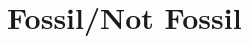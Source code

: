 \documentclass{beamer}
\begin{document}
\section{Fossil/Not Fossil}

\begin{frame}
\end{frame}

\begin{frame}
\end{frame}

\begin{frame}
\end{frame}
\end{document}
